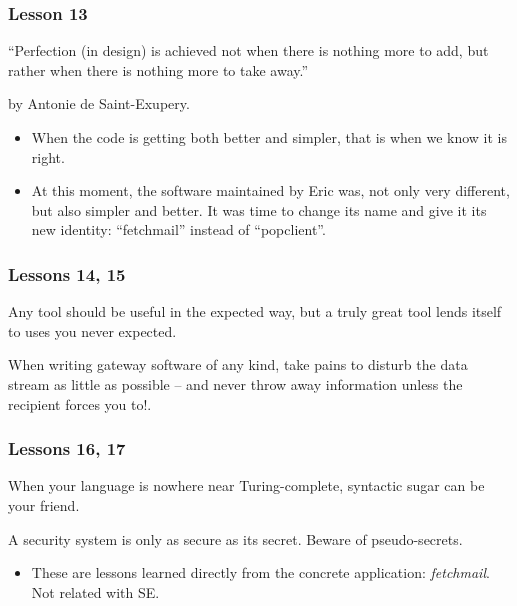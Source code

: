 \documentclass{beamer}
\begin{document}
\begin{frame}
\frametitle{Lesson 13}

\begin{center}
{\large ``Perfection (in design) is achieved not when there is nothing more to add, but rather when there is nothing more to take away.''}
\end{center}
by Antonie de Saint-Exupery.

\begin{itemize}
\item When the code is getting both better and simpler, that is when
  we know it is right.
\item At this moment, the software maintained by Eric was, not only
  very different, but also simpler and better. It was time to change
  its name and give it its new identity: ``fetchmail'' instead of
  ``popclient''.
\end{itemize}

\end{frame}


\begin{frame}
\frametitle{Lessons 14, 15}

\begin{center}
{\large Any tool should be useful in the expected way, but a truly
  great tool lends itself to uses you never expected.}
\end{center}

\begin{center}
{\large When writing gateway software of any kind, take pains to
  disturb the data stream as little as possible -- and never throw away information unless the recipient forces you to!.}
\end{center}

\end{frame}

\begin{frame}
\frametitle{Lessons 16, 17}

\begin{center}
{\large When your language is nowhere near Turing-complete, syntactic
  sugar can be your friend.}
\end{center}

\begin{center}
{\large A security system is only as secure as its secret. Beware of
  pseudo-secrets.}
\end{center}

\begin{itemize}
\item These are lessons learned directly from the concrete
  application: {\em fetchmail}. Not related with SE.
\end{itemize}

\end{frame}
\end{document}
